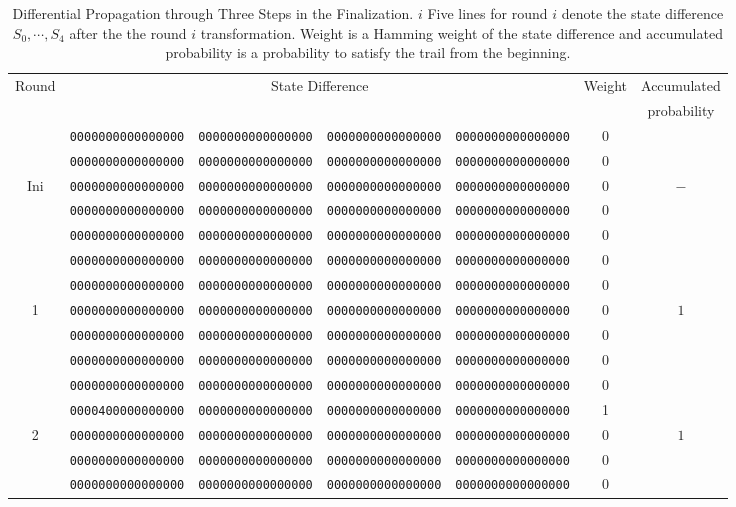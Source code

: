 \begin{table}[!tb]
\begin{center}
\caption{Differential Propagation through Three Steps in the Finalization. $i$ Five lines for round $i$ denote the state difference $S_0, \cdots, S_4$ after the the round $i$ transformation. Weight is a Hamming weight of the state difference and accumulated probability is a probability to satisfy the trail from the beginning.}
\label{Tbl:fin_diff}
{\tiny
\begin{tabular}{ccccccc} \hline
Round & \multicolumn{4}{c}{State Difference} & Weight & Accumulated \\
      & & & &                                &        & probability \\ \hline
      & {\tt 0000000000000000} & {\tt 0000000000000000} & {\tt 0000000000000000} & {\tt 0000000000000000} & 0  & \\
      & {\tt 0000000000000000} & {\tt 0000000000000000} & {\tt 0000000000000000} & {\tt 0000000000000000} & 0  & \\
Ini   & {\tt 0000000000000000} & {\tt 0000000000000000} & {\tt 0000000000000000} & {\tt 0000000000000000} & 0  & $-$ \\
      & {\tt 0000000000000000} & {\tt 0000000000000000} & {\tt 0000000000000000} & {\tt 0000000000000000} & 0  & \\
      & {\tt 0000000000000000} & {\tt 0000000000000000} & {\tt 0000000000000000} & {\tt 0000000000000000} & 0  & \\ \hline

      & {\tt 0000000000000000} & {\tt 0000000000000000} & {\tt 0000000000000000} & {\tt 0000000000000000} & 0  & \\
      & {\tt 0000000000000000} & {\tt 0000000000000000} & {\tt 0000000000000000} & {\tt 0000000000000000} & 0  & \\
1     & {\tt 0000000000000000} & {\tt 0000000000000000} & {\tt 0000000000000000} & {\tt 0000000000000000} & 0  & $1$\\
      & {\tt 0000000000000000} & {\tt 0000000000000000} & {\tt 0000000000000000} & {\tt 0000000000000000} & 0  & \\
      & {\tt 0000000000000000} & {\tt 0000000000000000} & {\tt 0000000000000000} & {\tt 0000000000000000} & 0  & \\ \hline

      & {\tt 0000000000000000} & {\tt 0000000000000000} & {\tt 0000000000000000} & {\tt 0000000000000000} & 0  & \\
      & {\tt 0000400000000000} & {\tt 0000000000000000} & {\tt 0000000000000000} & {\tt 0000000000000000} & 1  & \\
2     & {\tt 0000000000000000} & {\tt 0000000000000000} & {\tt 0000000000000000} & {\tt 0000000000000000} & 0  & $1$\\
      & {\tt 0000000000000000} & {\tt 0000000000000000} & {\tt 0000000000000000} & {\tt 0000000000000000} & 0  & \\
      & {\tt 0000000000000000} & {\tt 0000000000000000} & {\tt 0000000000000000} & {\tt 0000000000000000} & 0  & \\ \hline


\end{tabular}}
\end{center}
\end{table}
